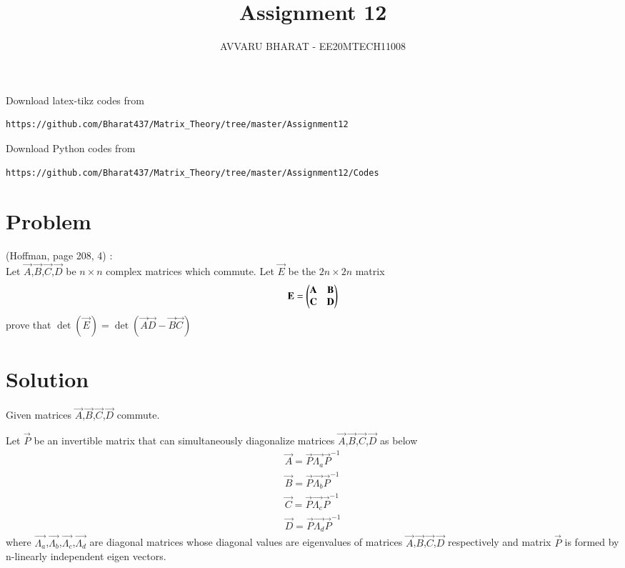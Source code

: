 \documentclass[journal,12pt,twocolumn]{IEEEtran}
\begin{document}
     \def\rightbox#1{\makebox[0in][r]{#1}}
     \def\centbox#1{\makebox[0in]{#1}}
     \def\topbox#1{\raisebox{-\baselineskip}[0in][0in]{#1}}
     \def\midbox#1{\raisebox{-0.5\baselineskip}[0in][0in]{#1}}
\vspace{3cm}
\title{Assignment 12}
\author{AVVARU BHARAT - EE20MTECH11008}
\maketitle
\newpage
\bigskip
\renewcommand{\thefigure}{\theenumi}
\renewcommand{\thetable}{\theenumi}
Download latex-tikz codes from 
%
\begin{lstlisting}
https://github.com/Bharat437/Matrix_Theory/tree/master/Assignment12
\end{lstlisting}
%
Download Python codes from 
%
\begin{lstlisting}
https://github.com/Bharat437/Matrix_Theory/tree/master/Assignment12/Codes
\end{lstlisting}
\section{Problem}
(Hoffman, page 208, 4) : \\
%
Let $\vec{A}$,$\vec{B}$,$\vec{C}$,$\vec{D}$ be $n\times n$ complex matrices which commute. Let $\vec{E}$ be the $2n\times 2n$ matrix
\begin{align}
    \mathbf{E}=\begin{pmatrix}\mathbf{A} & \mathbf{B}\\\mathbf{C} & \mathbf{D}\end{pmatrix}\label{E}
\end{align}
prove that $\det(\vec{E})=\det(\vec{A}\vec{D}-\vec{B}\vec{C})$
\section{Solution}
Given matrices $\vec{A}$,$\vec{B}$,$\vec{C}$,$\vec{D}$ commute.

Let $\vec{P}$ be an invertible matrix that can simultaneously diagonalize matrices $\vec{A}$,$\vec{B}$,$\vec{C}$,$\vec{D}$ as below
\begin{align}
    \vec{A}=\vec{P}\vec{\Lambda_a}\vec{P}^{-1}\label{A}\\
    \vec{B}=\vec{P}\vec{\Lambda_b}\vec{P}^{-1}\label{B}\\
    \vec{C}=\vec{P}\vec{\Lambda_c}\vec{P}^{-1}\label{C}\\
    \vec{D}=\vec{P}\vec{\Lambda_d}\vec{P}^{-1}\label{D}
\end{align}
where $\vec{\Lambda_a}$,$\vec{\Lambda_b}$,$\vec{\Lambda_c}$,$\vec{\Lambda_d}$ are diagonal matrices whose diagonal values are eigenvalues of matrices $\vec{A}$,$\vec{B}$,$\vec{C}$,$\vec{D}$ respectively and matrix $\vec{P}$ is formed by n-linearly independent eigen vectors.
\end{document}
